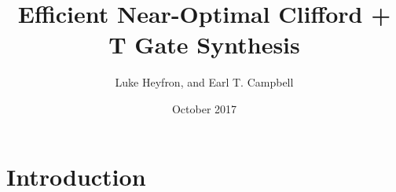 \documentclass[titlepage]{article}
\title{Efficient Near-Optimal Clifford + T Gate Synthesis}
\author{Luke Heyfron, and Earl T. Campbell}
\date{October 2017}
\theoremstyle{definition}
\theoremstyle{problem}
\theoremstyle{lemma}
\begin{document}
	\maketitle
	\begin{abstract}

	\end{abstract}
	
	\section{Introduction}

		
\end{document}

